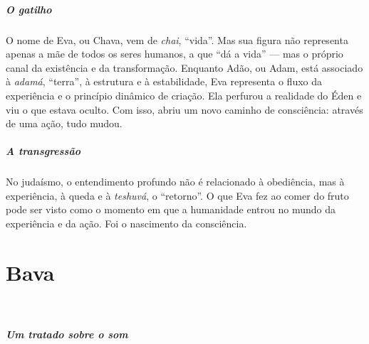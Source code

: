 \paragraph{O gatilho} O nome de Eva, ou Chava, vem de \textit{chai}, ``vida''. Mas sua figura não representa apenas a mãe de todos os seres humanos, a que ``dá a vida'' --- mas o próprio canal da existência e da transformação. Enquanto Adão, ou Adam, está associado à \textit{adamá}, ``terra'', à estrutura e à estabilidade, Eva representa o fluxo da experiência e o princípio dinâmico de criação. Ela perfurou a realidade do Éden e viu o que estava oculto. Com isso, abriu um novo caminho de consciência: através de uma ação, tudo mudou. %

\paragraph{A transgressão} No judaísmo, o entendimento profundo não é relacionado à obediência, mas à experiência, à queda e à \textit{teshuvá}, o ``retorno''. O que Eva fez ao comer do fruto pode ser visto como o momento em que a humanidade entrou no mundo da experiência e da ação. Foi o nascimento da consciência.

\chapter*{Bava 
\smallskip{}}

\begin{center}
{\huge{}}\\\medskip{\footnotesize\formularlight{
\lipsum[2]
}}
\end{center}

\paragraph{Um tratado sobre o som} 

